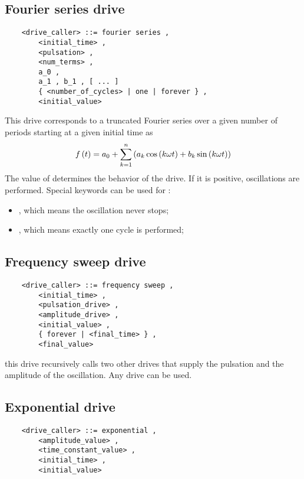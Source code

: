 \subsection{Fourier series drive}
\begin{verbatim}
    <drive_caller> ::= fourier series ,
        <initial_time> ,
        <pulsation> ,
        <num_terms> ,
        a_0 ,
        a_1 , b_1 , [ ... ]
        { <number_of_cycles> | one | forever } , 
        <initial_value>
\end{verbatim}
This drive corresponds to a truncated Fourier series over a given number
of periods starting at a given initial time as
\begin{displaymath}
	f\left( t \right) = a_0 + \sum_{k=1}^n \left( 
		a_k \cos\left( k\omega t \right)
		+ b_k \sin\left( k\omega t \right)
	 \right)
\end{displaymath}
The value of  determines the behavior of the
drive. 
If it is positive,  oscillations are
performed.
Special keywords can be used for :
\begin{itemize}
	\item {}, which means the oscillation never stops;
	\item {}, which means exactly one cycle is performed;
\end{itemize}

\subsection{Frequency sweep drive}
\begin{verbatim}
    <drive_caller> ::= frequency sweep ,
        <initial_time> ,
        <pulsation_drive> ,
        <amplitude_drive> ,
        <initial_value> ,
        { forever | <final_time> } ,
        <final_value>
\end{verbatim}
this drive recursively calls two other drives that supply the pulsation 
and the amplitude of the oscillation. Any drive can be used.

\subsection{Exponential drive}
\begin{verbatim}
    <drive_caller> ::= exponential ,
        <amplitude_value> ,
        <time_constant_value> ,
        <initial_time> ,
        <initial_value>
\end{verbatim}

